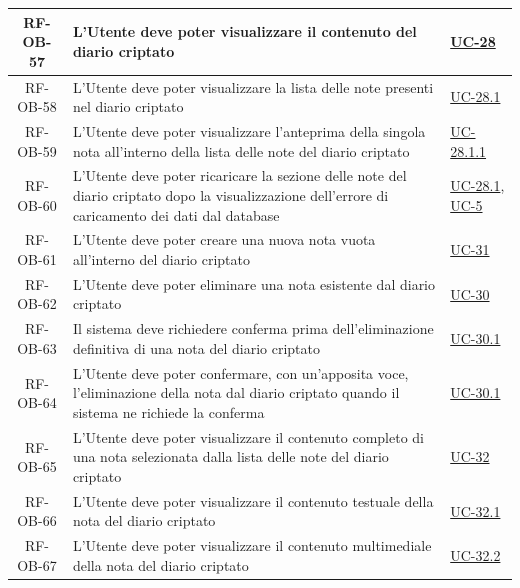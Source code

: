 \documentclass[a4paper,12pt]{article}
\begin{document}
\begin{center}
\begin{longtable}{|c|p{8.5cm}|>{\centering\arraybackslash}p{4cm}|}
RF-OB-57 & L'Utente deve poter visualizzare il contenuto del diario criptato & \hyperref[subsec:UC-28]{UC-28} \\
\hline

RF-OB-58 & L'Utente deve poter visualizzare la lista delle note presenti nel diario criptato & \hyperref[subsec:UC-28.1]{UC-28.1} \\
\hline

RF-OB-59 & L'Utente deve poter visualizzare l'anteprima della singola nota all'interno della lista delle note del diario criptato & \hyperref[subsec:UC-28.1.1]{UC-28.1.1} \\
\hline

RF-OB-60 & L'Utente deve poter ricaricare la sezione delle note del diario criptato dopo la visualizzazione dell'errore di caricamento dei dati dal database & \hyperref[subsec:UC-28.1]{UC-28.1}, \hyperref[sec:UC-5]{UC-5} \\
\hline

RF-OB-61 & L'Utente deve poter creare una nuova nota vuota all'interno del diario criptato & \hyperref[subsec:UC-31]{UC-31} \\
\hline

RF-OB-62 & L'Utente deve poter eliminare una nota esistente dal diario criptato & \hyperref[subsec:UC-30]{UC-30} \\
\hline

RF-OB-63 & Il sistema deve richiedere conferma prima dell'eliminazione definitiva di una nota del diario criptato & \hyperref[subsec:UC-30.1]{UC-30.1} \\
\hline

RF-OB-64 & L'Utente deve poter confermare, con un'apposita voce, l'eliminazione della nota dal diario criptato quando il sistema ne richiede la conferma & \hyperref[subsec:UC-30.1]{UC-30.1} \\
\hline

RF-OB-65 & L'Utente deve poter visualizzare il contenuto completo di una nota selezionata dalla lista delle note del diario criptato & \hyperref[subsec:UC-32]{UC-32} \\
\hline

RF-OB-66 & L'Utente deve poter visualizzare il contenuto testuale della nota del diario criptato & \hyperref[subsec:UC-32.1]{UC-32.1} \\
\hline

RF-OB-67 & L'Utente deve poter visualizzare il contenuto multimediale della nota del diario criptato & \hyperref[subsec:UC-32.2]{UC-32.2} \\
\hline


\end{longtable}
\end{center}
\end{document}
